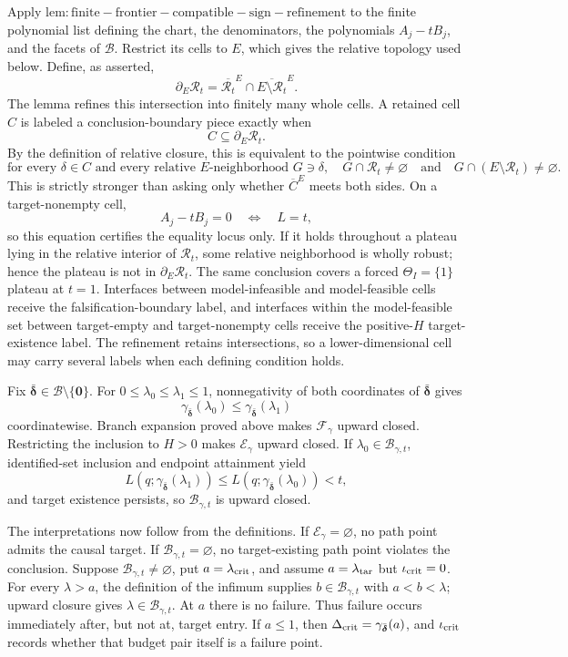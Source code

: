 Apply \(\mathrm{lem:finite-frontier-compatible-sign-refinement}\) to the finite polynomial list defining the chart, the denominators, the polynomials \(A_j-tB_j\), and the facets of \(\mathcal B\). Restrict its cells to \(E\), which gives the relative topology used below. Define, as asserted,
\[
 \partial_E\mathcal R_t
 =\overline{\mathcal R_t}^{E}
  \cap\overline{E\setminus\mathcal R_t}^{E}.
\]
The lemma refines this intersection into finitely many whole cells. A retained cell \(C\) is labeled a conclusion-boundary piece exactly when
\[
 C\subseteq\partial_E\mathcal R_t.
\]
By the definition of relative closure, this is equivalent to the pointwise condition
\[
 \text{for every }\delta\in C\text{ and every relative }E\text{-neighborhood }G\ni\delta,
 \quad
 G\cap\mathcal R_t\neq\varnothing
 \quad\text{and}\quad
 G\cap(E\setminus\mathcal R_t)\neq\varnothing.
\]
This is strictly stronger than asking only whether \(\overline C^{E}\) meets both sides. On a target-nonempty cell,
\[
 A_j-tB_j=0\quad\Longleftrightarrow\quad L=t,
\]
so this equation certifies the equality locus only. If it holds throughout a plateau lying in the relative interior of \(\mathcal R_t\), some relative neighborhood is wholly robust; hence the plateau is not in \(\partial_E\mathcal R_t\). The same conclusion covers a forced \(\Theta_I=\{1\}\) plateau at \(t=1\). Interfaces between model-infeasible and model-feasible cells receive the falsification-boundary label, and interfaces within the model-feasible set between target-empty and target-nonempty cells receive the positive-\(H\) target-existence label. The refinement retains intersections, so a lower-dimensional cell may carry several labels when each defining condition holds.

Fix \(\bar{\boldsymbol\delta}\in\mathcal B\setminus\{\boldsymbol0\}\). For \(0\leq\lambda_0\leq\lambda_1\leq1\), nonnegativity of both coordinates of \(\bar{\boldsymbol\delta}\) gives
\[
 \gamma_{\bar{\boldsymbol\delta}}(\lambda_0)
 \leq\gamma_{\bar{\boldsymbol\delta}}(\lambda_1)
\]
coordinatewise. Branch expansion proved above makes \(\mathcal F_\gamma\) upward closed. Restricting the inclusion to \(H>0\) makes \(\mathcal E_\gamma\) upward closed. If \(\lambda_0\in\mathcal B_{\gamma,t}\), identified-set inclusion and endpoint attainment yield
\[
 L(q;\gamma_{\bar{\boldsymbol\delta}}(\lambda_1))
 \leq L(q;\gamma_{\bar{\boldsymbol\delta}}(\lambda_0))<t,
\]
and target existence persists, so \(\mathcal B_{\gamma,t}\) is upward closed.

The interpretations now follow from the definitions. If \(\mathcal E_\gamma=\varnothing\), no path point admits the causal target. If \(\mathcal B_{\gamma,t}=\varnothing\), no target-existing path point violates the conclusion. Suppose \(\mathcal B_{\gamma,t}\neq\varnothing\), put \(a=\lambda_{\rm crit}\), and assume \(a=\lambda_{\rm tar}\) but \(\iota_{\rm crit}=0\). For every \(\lambda>a\), the definition of the infimum supplies \(b\in\mathcal B_{\gamma,t}\) with \(a<b<\lambda\); upward closure gives \(\lambda\in\mathcal B_{\gamma,t}\). At \(a\) there is no failure. Thus failure occurs immediately after, but not at, target entry. If \(a\leq1\), then \(\Delta_{\rm crit}=\gamma_{\bar{\boldsymbol\delta}}(a)\), and \(\iota_{\rm crit}\) records whether that budget pair itself is a failure point.

